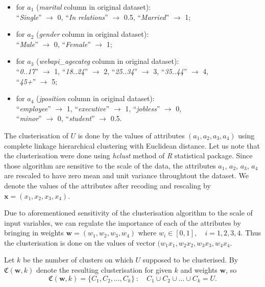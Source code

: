 \documentclass[runningheads,a4paper]{llncs}
\begin{document}
\begin{itemize}
\item for $a_1$ (\textit{marital} column in original dataset): \\ 
	``\textit{Single}''  $\to$ 0,  \qquad  ``\textit{In relations}''  $\to$ 0.5, \qquad  ``\textit{Married}''  $\to$ 1;
	\smallskip
	
\item for $a_2$ (\textit{gender} column in original dataset): \\ 
	``\textit{Male}''  $\to$ 0, \qquad  ``\textit{Female}'' $\to$ 1;
	\smallskip
	
\item for $a_3$ (\textit{webapi\_agecateg} column in original dataset): \\ 
	``\textit{0..17}''  $\to$ 1, \qquad  ``\textit{18..24}''  $\to$ 2, \qquad     ``\textit{25..34}''  $\to$ 3, \qquad  ``\textit{35..44}''  $\to$ 4, \\     ``\textit{45+}''  $\to$ 5;
	\smallskip
		
\item for $a_4$ (\textit{jposition} column in original dataset): \\ 
	``\textit{employee}'' $\to$ 1, \qquad  ``\textit{executive}'' $\to$ 1, \qquad  ``\textit{jobless}'' $\to$ 0, \\  ``\textit{minor}'' $\to$ 0, \qquad  ``\textit{student}'' $\to$ 0.5.
\end{itemize}

The clusterisation of $U$ is done by the values of attributes $(a_1, a_2, a_3, a_4)$ using complete linkage hierarchical clustering with Euclidean distance. Let us note that the clusterisation were done using \textit{hclust} method of \textit{R} statistical package. Since those algorithm are sensitive to the scale of the data, the attributes $a_1$, $a_2$, $a_3$, $a_4$ are rescaled to have zero mean and unit variance throughtout the dataset. We denote the values of the attributes after recoding and rescaling by $\boldsymbol{x} = (x_1, x_2, x_3, x_4)$.

Due to aforementioned sensitivity of the clusterisation algorithm to the scale of input variables, we can regulate the importance of each of the attributes by bringing in weights $\boldsymbol{w} = (w_1, w_2, w_3, w_4)$ where \quad $w_i \in [0, 1], \quad i = 1,2,3,4$. Thus the clusterisation is done on the values of vector $(w_1 x_1, w_2 x_2, w_3 x_3, w_4 x_4$.

Let $k$ be the number of clusters on which $U$ supposed to be clusterised. By $\mathfrak{C}(\boldsymbol{w}, k)$ denote the resulting clusterisation for given $k$ and weights $\boldsymbol{w}$, so
\[
	\mathfrak{C}(\boldsymbol{w}, k) = \{C_1, C_2, \dots, C_k\} \  \colon  \quad  C_1 \cup C_2 \cup \dots \cup C_k = U.
\]
\end{document}
